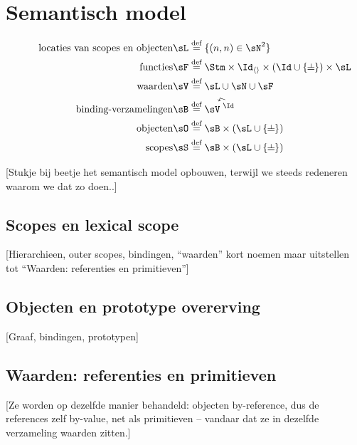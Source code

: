 
\chapter{Semantisch model}

\begin{align*}
  \tag*{locaties van scopes en objecten}
  \sL &\DEF \{ (n, n) \in \sN^2 \} \\
  \tag*{functies}
  \sF &\DEF \Stm \times \Id_{\langle\rangle} \times (\Id \cup \{\BOT\}) \times \sL \\
  \tag*{waarden}
  \sV &\DEF \sL \cup \sN \cup \sF \\
  \tag*{binding-verzamelingen}
  \sB &\DEF \FiniteFunctions{\sV}{\Id} \\
  \tag*{objecten}
  \sO &\DEF \sB \times (\sL \cup \{\BOT\}) \\
  \tag*{scopes}
  \sS &\DEF \sB \times (\sL \cup \{\BOT\}) \\
\end{align*}

[Stukje bij beetje het semantisch model opbouwen, terwijl we steeds redeneren waarom we dat zo doen..]

\section{Scopes en lexical scope}

[Hierarchieen, outer scopes, bindingen, ``waarden'' kort noemen maar uitstellen tot ``Waarden: referenties en primitieven'']

\section{Objecten en prototype overerving}

[Graaf, bindingen, prototypen]

\section{Waarden: referenties en primitieven}

[Ze worden op dezelfde manier behandeld: objecten by-reference, dus de references zelf by-value, net als primitieven -- vandaar dat ze in dezelfde verzameling waarden zitten.]